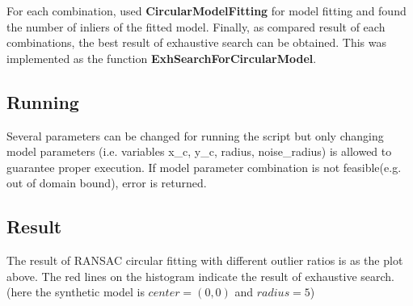 \documentclass[paper=a4, fontsize=11pt]{scrartcl} %
\numberwithin{equation}{section} %
\numberwithin{figure}{section} %
\numberwithin{table}{section} %
\newcommand{\funcname}[1]{\textbf{#1}}
\begin{document}
For each combination, used \funcname{CircularModelFitting} for model fitting and found the number of inliers of the fitted model. Finally, as compared result of each combinations, the best result of exhaustive search can be obtained. This was implemented as the function \funcname{ExhSearchForCircularModel}.

\subsection{Running}

Several parameters can be changed for running the script but only changing model parameters (i.e. variables x\_c, y\_c, radius, noise\_radius) is allowed to guarantee proper execution. If model parameter combination is not feasible(e.g. out of domain bound), error is returned. \\

\subsection{Result}

\noindent{}

The result of RANSAC circular fitting with different outlier ratios is as the plot above. The red lines on the histogram indicate the result of exhaustive search. (here the synthetic model is $center = (0, 0)$ and $radius = 5$)\\
\end{document}
